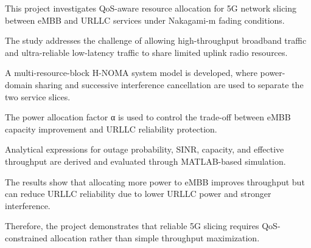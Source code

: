 \documentclass[
]{article}
\begin{document}
This project investigates QoS-aware resource allocation for 5G network slicing between eMBB and URLLC services under Nakagami-m fading conditions.

The study addresses the challenge of allowing high-throughput broadband traffic and ultra-reliable low-latency traffic to share limited uplink radio resources.

A multi-resource-block H-NOMA system model is developed, where power-domain sharing and successive interference cancellation are used to separate the two service slices.

The power allocation factor α is used to control the trade-off between eMBB capacity improvement and URLLC reliability protection.

Analytical expressions for outage probability, SINR, capacity, and effective throughput are derived and evaluated through MATLAB-based simulation.

The results show that allocating more power to eMBB improves throughput but can reduce URLLC reliability due to lower URLLC power and stronger interference.

Therefore, the project demonstrates that reliable 5G slicing requires QoS-constrained allocation rather than simple throughput maximization.
\clearpage

\tableofcontents
\clearpage

\listoffigures
{}
\clearpage

\listoftables
{}
\clearpage

\end{document}
